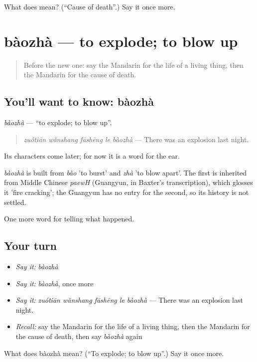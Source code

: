 \begin{tcolorbox}[breakable,colback=teal!4,colframe=teal!35!black,title={Before you move on}]
What does  mean? (\textquotedblleft{}Cause of death\textquotedblright{}.) Say it once more.
\end{tcolorbox}
\section[bàozhà]{bàozhà — to explode; to blow up}

\label{lesson:ZH-C300-baozha}



\begin{quote}
Before the new one: say the Mandarin for the life of a living thing, then the Mandarin for the cause of death.
\end{quote}

\subsection*{You'll want to know: bàozhà}
\emph{bàozhà} — \textquotedblleft{}to explode; to blow up\textquotedblright{}.

\begin{quote}
\emph{zuótiān wǎnshang fāshēng le bàozhà} — There was an explosion last night.
\end{quote}

Its characters come later; for now it is a word for the ear.

\begin{cousinweb}
\emph{bàozhà} is built from \emph{bào} 'to burst' and \emph{zhà} 'to blow apart'. The first is inherited from Middle Chinese \emph{paewH} (Guangyun, in Baxter's transcription), which glosses it 'fire cracking'; the Guangyun has no entry for the second, so its history is not settled.
\end{cousinweb}

\begin{grammarlens}[title={What you've built}]
One more word for telling what happened.
\end{grammarlens}

\subsection*{Your turn}
\begin{itemize}
\raggedright
  \item \emph{Say it:} \emph{bàozhà}
  \item \emph{Say it:} \emph{bàozhà}, once more
  \item \emph{Say it:} \emph{zuótiān wǎnshang fāshēng le bàozhà} — There was an explosion last night.
  \item \emph{Recall:} say the Mandarin for the life of a living thing, then the Mandarin for the cause of death, then say \emph{bàozhà} again
\end{itemize}

\begin{tcolorbox}[breakable,colback=teal!4,colframe=teal!35!black,title={Before you move on}]
What does bàozhà mean? (\textquotedblleft{}To explode; to blow up\textquotedblright{}.) Say it once more.
\end{tcolorbox}
